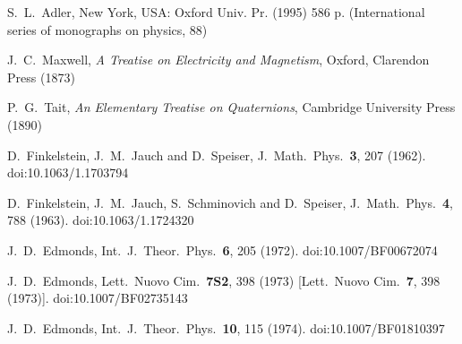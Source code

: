 \documentclass[epsfig,12pt]{article}
\begin{document}
\small
\begin{thebibliography}{99}
\itemsep -2pt

  S.~L.~Adler,
  New York, USA: Oxford Univ. Pr. (1995) 586 p. (International series of monographs on physics, 88)

  J.~C.~Maxwell,
  {\it A Treatise on Electricity and Magnetism},
  Oxford, Clarendon Press (1873)

  P.~G.~Tait,
  {\it An Elementary Treatise on Quaternions},
  Cambridge University Press (1890)

  D.~Finkelstein, J.~M.~Jauch and D.~Speiser,
  J.\ Math.\ Phys.\  {\bf 3}, 207 (1962).
  doi:10.1063/1.1703794

  D.~Finkelstein, J.~M.~Jauch, S.~Schminovich and D.~Speiser,
  J.\ Math.\ Phys.\  {\bf 4}, 788 (1963).
  doi:10.1063/1.1724320

  J.~D.~Edmonds,
  Int.\ J.\ Theor.\ Phys.\  {\bf 6}, 205 (1972).
  doi:10.1007/BF00672074

  J.~D.~Edmonds,
  Lett.\ Nuovo Cim.\  {\bf 7S2}, 398 (1973)
  [Lett.\ Nuovo Cim.\  {\bf 7}, 398 (1973)].
  doi:10.1007/BF02735143

  J.~D.~Edmonds,
  Int.\ J.\ Theor.\ Phys.\  {\bf 10}, 115 (1974).
  doi:10.1007/BF01810397


\end{thebibliography}
\end{document}

